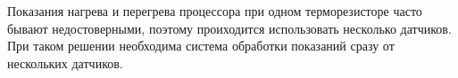 
Показания нагрева и перегрева процессора при одном терморезисторе 
часто бывают недостоверными, поэтому проиходится использовать несколько
датчиков. При таком решении необходима система обработки показаний 
сразу от нескольких датчиков.

\clearpage


